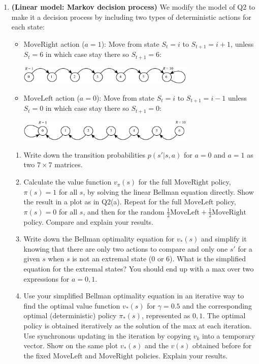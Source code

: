 \documentclass[11pt,a4paper]{article}
\newcommand{\mL}{\textrm{MoveLeft}}
\newcommand{\mR}{\textrm{MoveRight}}
\newcommand{\wt}{\marginpar{[*]}}
\begin{document}
\begin{enumerate}[\bf Q1.]
\item \textbf{(Linear model: Markov decision process)} We modify the model of Q2 to make it a decision process by including two types of deterministic actions for each state: 
\begin{itemize}
\item $\mR$ action ($a=1$): Move from state $S_{t}=i$ to $S_{t+1}=i+1$, unless $S_t=6$ in which case stay there so $S_{t+1}=6$:
\begin{center}
\includegraphics[width=0.7\textwidth]{moveright1-crop.pdf}
\end{center}
\item $\mL$ action ($a=0$): Move from state $S_t=i$ to $S_{t+1}=i-1$ unless $S_t=0$ in which case stay there so $S_{t+1}=0$:
\begin{center}
\includegraphics[width=0.7\textwidth]{moveleft1-crop.pdf}
\end{center}
\end{itemize}

\begin{enumerate}[\bf (a)]
\item Write down the transition probabilities $p(s'|s,a)$ for $a=0$ and $a=1$ as two $7\times 7$ matrices.

\item Calculate the value function $v_\pi(s)$ for the full $\mR$ policy, $\pi(s)=1$ for all $s$, by solving the linear Bellman equation directly. Show the result in a plot as in Q2(a). Repeat for the full $\mL$ policy, $\pi(s)=0$ for all $s$, and then for the random $\frac{1}{2}\mL+\frac{1}{2}\mR$ policy. Compare and explain your results.

\item Write \wt down the Bellman optimality equation for $v_*(s)$ and simplify it knowing that there are only two actions to compare and only one $s'$ for a given $s$ when $s$ is not an extremal state  (0 or 6). What is the simplified equation for the extremal states? You should end up with a max over two expressions for $a=0,1$.

\item Use \wt your simplified Bellman optimality equation in an iterative way to find the optimal value function $v_*(s)$ for $\gamma=0.5$ and the corresponding optimal (deterministic) policy $\pi_*(s)$, represented as $0,1$. The optimal policy is obtained iteratively as the solution of the max at each iteration. Use synchronous updating in the iteration by copying $v_k$ into a temporary vector. Show on the same plot $v_*(s)$ and the $v(s)$ obtained before for the fixed $\mL$ and $\mR$ policies. Explain your results.


\end{enumerate}
\end{enumerate}
\end{document}
